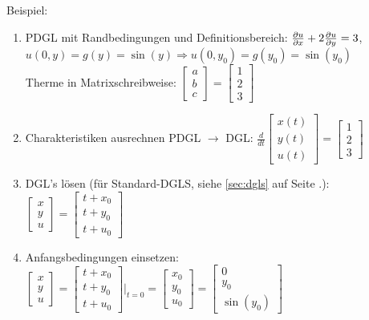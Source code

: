 Beispiel:\\
\begin{enumerate}
	\item PDGL mit Randbedingungen und Definitionsbereich: $\frac{\partial u}{\partial x}+2\frac{\partial u}{\partial y}=3$, \; $u(0,y)=g(y)=\sin(y) \Rightarrow u(0,y_0) = g(y_0) = \sin(y_0)$\\
	Therme in Matrixschreibweise: $\begin{bmatrix}a\\b\\c\end{bmatrix}=\begin{bmatrix}1\\2\\3\end{bmatrix}$
	\item Charakteristiken ausrechnen PDGL $\rightarrow$ DGL: 	$\frac {d}{dt}\begin{bmatrix}x(t)\\y(t)\\u(t)\end{bmatrix}=\begin{bmatrix}1\\2\\3\end{bmatrix}$
	\item DGL's lösen (für Standard-DGLS, siehe \ref{sec:dgls} auf Seite \pageref{sec:dgls}.): 
	$\begin{bmatrix}x\\y\\u\end{bmatrix}=\begin{bmatrix}t+x_0\\t+y_0\\t+u_0\end{bmatrix}$
	\item Anfangsbedingungen einsetzen: $\begin{bmatrix}x\\y\\u\end{bmatrix}=\begin{bmatrix}t+x_0\\t+y_0\\t+u_0\end{bmatrix}\Bigg|_{t=0}=
	\begin{bmatrix}x_0\\y_0\\u_0\end{bmatrix}=\begin{bmatrix}0\\y_0\\\sin(y_0)\end{bmatrix}$\\

\end{enumerate}
